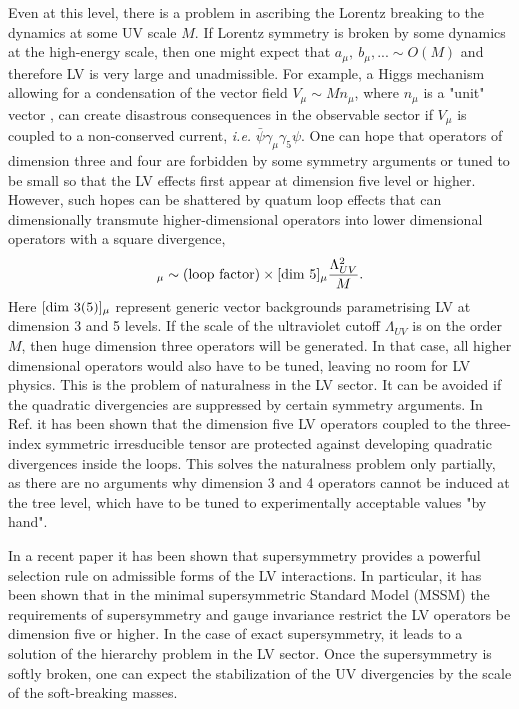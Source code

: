 \documentclass[paper,12pt]{revtex4}
\begin{document}
Even at this level, there is a problem in ascribing the Lorentz breaking 
to the dynamics at some UV scale $M$. If Lorentz symmetry is broken by 
some dynamics at the high-energy scale, then one might expect that $a_\mu,~b_\mu,... \sim O(M)$
and therefore LV is very large and unadmissible. For example, a Higgs mechanism 
allowing for a condensation of the vector field $V_{\mu}\sim M n_\mu$, where $n_\mu$ is a 
"unit" vector \cite{Kostelecky:1989jw}, can create disastrous consequences in the observable sector if 
$V_\mu$ is coupled to a non-conserved current, {\em i.e.} $\bar \psi \gamma_\mu\gamma_5 \psi$.  
One can hope that operators of dimension three and four are forbidden by 
some symmetry arguments or tuned to be small so that the LV effects 
first appear at dimension five level \cite{MP:} 
or higher. However, such hopes can be shattered by quatum loop effects that 
can dimensionally transmute higher-dimensional operators into lower dimensional operators
with a square divergence,
\begin{equation}
[{\rm dim}~3]_{\mu} \sim ({\rm loop~factor})\times [{\rm dim}~5]_{\mu} \frac{\Lambda_{UV}^2}{M}.
\label{transmute}
\end{equation}
Here $[{\rm dim}~3(5)]_{\mu}$ represent generic vector backgrounds 
parametrising LV at dimension 3 and 5 levels. If the scale of the 
ultraviolet cutoff $\Lambda_{UV}$ is on the order $M$, 
then huge dimension three operators will be generated. 
In that case, all higher dimensional operators would also 
have to be tuned, leaving no room for LV physics. 
This is the problem of naturalness in the LV sector. 
It can be avoided if the quadratic divergencies are suppressed
by certain symmetry arguments. In Ref. \cite{MP:} it has been 
shown that the dimension five LV operators coupled to the three-index symmetric 
irresducible tensor are protected against developing quadratic divergences
inside the loops. This solves the naturalness problem only partially, as there 
are no arguments why dimension 3 and 4 operators cannot be induced at 
the tree level, which have to be tuned to experimentally acceptable values  "by hand". 

In a recent paper \cite{GrootNibbelink:2004za} it has been shown that supersymmetry provides a powerful selection 
rule on admissible forms of the LV interactions. In particular, it has been shown that 
in the minimal supersymmetric Standard Model (MSSM) the requirements of supersymmetry and
gauge invariance restrict the LV operators be dimension five or higher. In the case 
of exact supersymmetry, it leads to a solution of the hierarchy problem in 
the LV sector. Once the supersymmetry is softly broken, one can expect the stabilization of 
the UV divergencies by the scale of the soft-breaking masses. 
\end{document}
